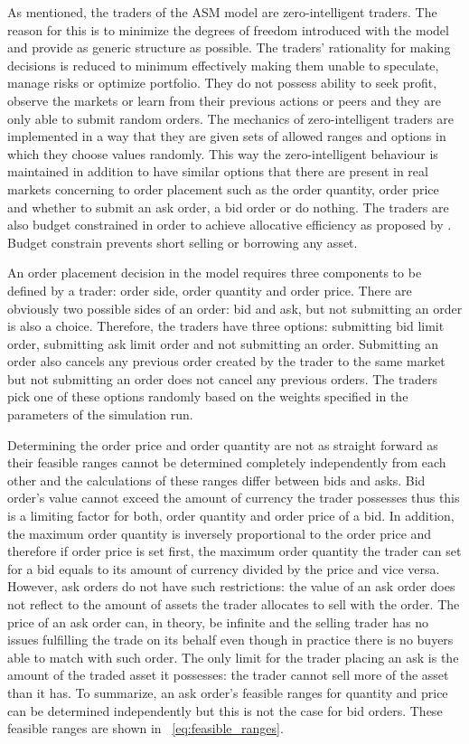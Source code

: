 As mentioned, the traders of the ASM model are zero-intelligent
traders. The reason for this is to minimize the degrees of freedom introduced with
the model and provide as generic structure as possible. The traders' rationality 
for making decisions is reduced to minimum effectively making them unable to speculate, 
manage risks or optimize portfolio. They do not possess ability to seek profit, 
observe the markets or learn from their previous actions or peers and
they are only able to submit random orders. The mechanics of zero-intelligent traders
are implemented in a way that they are given sets of allowed ranges 
and options in which they choose values randomly. This way the zero-intelligent behaviour is maintained
in addition to have similar options that there are present in real markets 
concerning to order placement such as the order quantity, order price and whether
to submit an ask order, a bid order or do nothing. The traders are also budget constrained
in order to achieve allocative efficiency as proposed by
\citet{God93}. Budget constrain prevents short selling or borrowing any asset.


An order placement decision in the model requires three components 
to be defined by a trader: order side, order quantity and order price. 
There are obviously two possible sides of an order: bid and ask, but
not submitting an order is also a choice. Therefore, the traders
have three options: submitting bid limit order, submitting ask limit order
and not submitting an order. Submitting an order also cancels any previous
order created by the trader to the same market but not submitting an order does not
cancel any previous orders. The traders pick one of these options randomly 
based on the weights specified in the parameters of the simulation run. 

Determining the order price and order quantity are not as straight
forward as their feasible ranges cannot be determined completely independently
from each other and the calculations of these ranges differ between bids and asks. Bid order's
value cannot exceed the amount of currency the trader possesses thus this is 
a limiting factor for both, order quantity and order price of a bid. In addition,
the maximum order quantity is inversely proportional to the order price and
therefore if order price is set first, the maximum order quantity the trader
can set for a bid equals to its amount of currency divided by the price and vice versa. 
However, ask orders do not have such restrictions: the value of an ask order
does not reflect to the amount of assets the trader allocates to sell with the order. The
price of an ask order can, in theory, be infinite and the selling trader has no issues
fulfilling the trade on its behalf even though in practice there is no buyers
able to match with such order. The only limit for the trader placing an ask is the 
amount of the traded asset it possesses: the trader cannot sell more of the asset 
than it has. To summarize, an ask order's feasible ranges for quantity and price 
can be determined independently but this is not the case for bid orders. These feasible 
ranges are shown in ~\ref{eq:feasible_ranges}.


